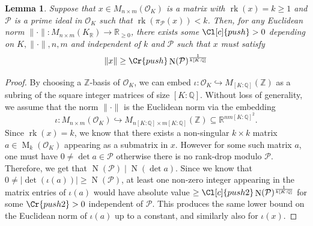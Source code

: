 \documentclass{amsart}
\newtheorem{lemma}[theorem]{Lemma}
\theoremstyle{definition}
\theoremstyle{remark}
\newcommand{\OK}{\mathcal{O}_K}
\DeclareMathOperator{\M}{M}
\DeclareMathOperator{\rank}{rk}
\DeclareMathOperator{\N}{N}
\begin{document}
\begin{lemma}
    Suppose that $x \in M_{n \times m }\left(\mathcal{O}_{K}\right)$ is a matrix with $\rank(x) = k \geq 1$ and $\mathcal{P}$ is a prime ideal in $\mathcal{O}_K$ such that $\rank(\pi_\mathcal{P}(x)) < k$. 
    Then, for any Euclidean norm $\| \cdot \|: M_{n \times m }(K_\mathbb{R})  \rightarrow \mathbb{R}_{\ge 0}$, there exists some $\Cl[c]{push}>0$ 
    depending on $K,\|\cdot\|,n,m$ and independent of $k$ and $\mathcal{P}$ such that $x$ must satisfy
    \begin{equation}
        \|x\| \ge \Cr{push} \N(\mathcal{P})^{\frac{1}{k[K:\mathbb{Q}]}}
    \end{equation}
    \label{le:rankdrop}
\end{lemma}
\begin{proof}
    By choosing a $\mathbb{Z}$-basis of $\OK$, we can embed $\iota:\mathcal{O}_K \hookrightarrow M_{[K:\mathbb{Q}]}(\mathbb{Z})$ as a subring of the square integer matrices of size $[K:\mathbb{Q}]$. 
    Without loss of generality, we assume that the norm $\|\cdot \|$ is the Euclidean norm via the embedding 
    $$\iota: M_{n\times m }(\OK)\hookrightarrow M_{n[K:\mathbb{Q}] \times m[K:\mathbb{Q}]}(\mathbb{Z}) \subseteq \mathbb{R}^{nm[K:\mathbb{Q}]^{2}}.$$ 
    Since $\rank(x)=k$, we know that there exists a non-singular $k \times k$ matrix $a \in \M_{k}(\OK)$ 
    appearing as a submatrix in $x$. 
    However for some such matrix $a$, one must have
    $ 0 \neq \det a \in \mathcal{P}$ otherwise there is no rank-drop modulo $\mathcal{P}$. 
    Therefore, we get that 
    $\N(\mathcal{P}) \mid \N(\det a).$
    Since we know that $0 \neq |\det(\iota(a))| \ge \N(\mathcal{P})$, at least one non-zero integer appearing in the matrix entries of $\iota(a)$ would have absolute value $\geq \Cl[c]{push2} \N(\mathcal{P})^{\frac{1}{k[K:\mathbb{Q}]}}$ for some $\Cr{push2}>0$ independent of $\mathcal{P}$. This produces the same lower bound on the Euclidean norm of $\iota(a)$ up to a constant, and similarly also for $\iota(x)$.
\end{proof}
\end{document}
